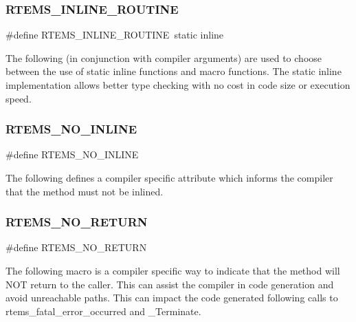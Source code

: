 \subsubsection{\texorpdfstring{RTEMS\_INLINE\_ROUTINE}{RTEMS\_INLINE\_ROUTINE}}
{\footnotesize\ttfamily \#define R\+T\+E\+M\+S\+\_\+\+I\+N\+L\+I\+N\+E\+\_\+\+R\+O\+U\+T\+I\+NE~static inline}

The following (in conjunction with compiler arguments) are used to choose between the use of static inline functions and macro functions. The static inline implementation allows better type checking with no cost in code size or execution speed. \mbox{\label{group__RTEMSScoreBaseDefs_gae7e4f8ea7e3b299c78561f1102122ff4}} 
\subsubsection{\texorpdfstring{RTEMS\_NO\_INLINE}{RTEMS\_NO\_INLINE}}
{\footnotesize\ttfamily \#define R\+T\+E\+M\+S\+\_\+\+N\+O\+\_\+\+I\+N\+L\+I\+NE}

The following defines a compiler specific attribute which informs the compiler that the method must not be inlined. \mbox{\label{group__RTEMSScoreBaseDefs_gaa2f0ed67aa174f684bb31b7e8bdb386f}} 
\subsubsection{\texorpdfstring{RTEMS\_NO\_RETURN}{RTEMS\_NO\_RETURN}}
{\footnotesize\ttfamily \#define R\+T\+E\+M\+S\+\_\+\+N\+O\+\_\+\+R\+E\+T\+U\+RN}

The following macro is a compiler specific way to indicate that the method will N\+OT return to the caller. This can assist the compiler in code generation and avoid unreachable paths. This can impact the code generated following calls to rtems\+\_\+fatal\+\_\+error\+\_\+occurred and \+\_\+\+Terminate. \mbox{\label{group__RTEMSScoreBaseDefs_ga55dfc714fe0b57dd818fcafbbdf6197a}} 
